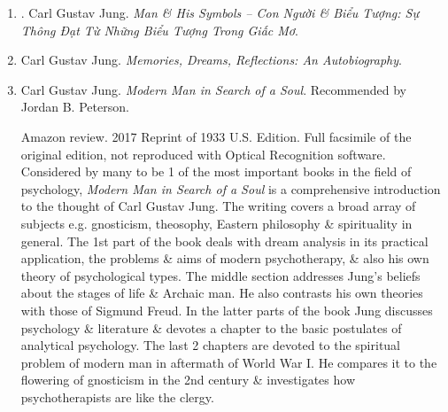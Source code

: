 \documentclass{article}
\begin{document}
\begin{enumerate}
	{\sf About the Author.} {\sc Carl Gustav Jung} (1875--1961) was a Swiss psychiatrist, an influential thinker \& the founder of analytical psychology (also known as Jungian psychology). Jung's radical approach to psychology has been influential in the field of depth psychology \& in counter-cultural movements across the globe. {\sc Jung}'s radical approach to psychology has been influential in the field of depth psychology \& in counter-cultural movements across the globe. {\sc Jung} is considered the 1st modern psychologist to state that the human psyche is ``by nature religious'' \& to explore it in depth. His major works include ``Analytic Psychology: Its Theory \& Practice'', ``Man \& His Symbols,'' ``Memories, Dreams, Reflections'', ``The Collected Works of Carl G. Jung'', \& ``The Red Book''.
	\item \cite{Jung_man_symbol_VN}. {\sc Carl Gustav Jung}. {\it Man \& His Symbols -- Con Người \& Biểu Tượng: Sự Thông Đạt Từ Những Biểu Tượng Trong Giấc Mơ}.\hfill{\sf[done]}
	\item {\sc Carl Gustav Jung}. {\it Memories, Dreams, Reflections: An Autobiography}.
	\item {\sc Carl Gustav Jung}. {\it Modern Man in Search of a Soul}. {} Recommended by {\sc Jordan B. Peterson}.

	{\sf Amazon review.} 2017 Reprint of 1933 U.S. Edition. Full facsimile of the original edition, not reproduced with Optical Recognition software. Considered by many to be 1 of the most important books in the field of psychology, {\it Modern Man in Search of a Soul} is a comprehensive introduction to the thought of {\sc Carl Gustav Jung}. The writing covers a broad array of subjects e.g. gnosticism, theosophy, Eastern philosophy \& spirituality in general. The 1st part of the book deals with dream analysis in its practical application, the problems \& aims of modern psychotherapy, \& also his own theory of psychological types. The middle section addresses {\sc Jung}'s beliefs about the stages of life \& Archaic man. He also contrasts his own theories with those of {\sc Sigmund Freud}. In the latter parts of the book {\sc Jung} discusses psychology \& literature \& devotes a chapter to the basic postulates of analytical psychology. The last 2 chapters are devoted to the spiritual problem of modern man in aftermath of World War I. He compares it to the flowering of gnosticism in the 2nd century \& investigates how psychotherapists are like the clergy.


\end{enumerate}
\end{document}
